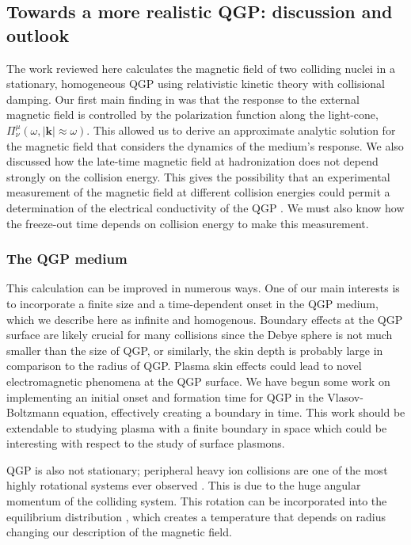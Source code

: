 
\subsection{Towards a more realistic QGP: discussion and outlook }\label{sec:ConclusionsQGP}
The work reviewed here calculates the magnetic field of two colliding nuclei in a stationary, homogeneous QGP using relativistic kinetic theory with collisional damping. Our first main finding in \cite{Grayson:2022asf} was that the response to the external magnetic field is controlled by the polarization function along the light-cone, $\Pi^\mu_\nu(\omega ,|\boldsymbol{k}|\approx\omega)$. This allowed us to derive an approximate analytic solution for the magnetic field that considers the dynamics of the medium's response. We also discussed how the late-time magnetic field at hadronization does not depend strongly on the collision energy. This gives the possibility that an experimental measurement of the magnetic field at different collision energies could permit a determination of the electrical conductivity of the QGP \cite{STAR:2023jdd}. We must also know how the freeze-out time depends on collision energy to make this measurement.

\subsubsection{The QGP medium}
This calculation can be improved in numerous ways. One of our main interests is to incorporate a finite size and a time-dependent onset in the QGP medium, which we describe here as infinite and homogenous. Boundary effects at the QGP surface are likely crucial for many collisions since the Debye sphere is not much smaller than the size of QGP, or similarly, the skin depth is probably large in comparison to the radius of QGP. Plasma skin effects could lead to novel electromagnetic phenomena at the QGP surface. We have begun some work on implementing an initial onset and formation time for QGP in the Vlasov-Boltzmann equation, effectively creating a boundary in time. This work should be extendable to studying plasma with a finite boundary in space which could be interesting with respect to the study of surface plasmons.

QGP is also not stationary; peripheral heavy ion collisions are one of the most highly rotational systems ever observed \cite{Csernai:2013bq,Deng:2016vhi,Jiang:2016woz,Becattini:2020pvq}. This is due to the huge angular momentum of the colliding system. This rotation can be incorporated into the equilibrium distribution \cite{Hakim:2011bk}, which creates a temperature that depends on radius \cite{Chernikov:1964edr} changing our description of the magnetic field.

